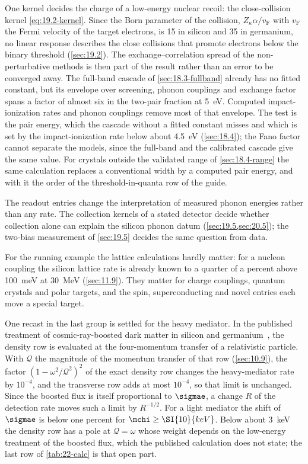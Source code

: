 One kernel decides the charge of a low-energy nuclear recoil: the close-collision kernel \cref{eq:19.2-kernel}. Since the Born parameter of the collision, $Z_\kappa\alpha/v_{\mathrm{F}}$ with $v_{\mathrm{F}}$ the Fermi velocity of the target electrons, is 15 in silicon and 35 in germanium, no linear response describes the close collisions that promote electrons below the binary threshold (\cref{sec:19.2}). The exchange--correlation spread of the non-perturbative methods is then part of the result rather than an error to be converged away. The full-band cascade of \cref{sec:18.3-fullband} already has no fitted constant, but its envelope over screening, phonon couplings and exchange factor spans a factor of almost six in the two-pair fraction at \SI{5}{eV}. Computed impact-ionization rates and phonon couplings remove most of that envelope. The test is the pair energy, which the cascade without a fitted constant misses and which is set by the impact-ionization rate below about \SI{4.5}{eV} (\cref{sec:18.4}); the Fano factor cannot separate the models, since the full-band and the calibrated cascade give the same value. For crystals outside the validated range of \cref{sec:18.4-range} the same calculation replaces a conventional width by a computed pair energy, and with it the order of the threshold-in-quanta row of the guide.

The readout entries change the interpretation of measured phonon energies rather than any rate. The collection kernels of a stated detector decide whether collection alone can explain the silicon phonon datum (\cref{sec:19.5,sec:20.5}); the two-bias measurement of \cref{sec:19.5} decides the same question from data.

For the running example the lattice calculations hardly matter: for a nucleon coupling the silicon lattice rate is already known to a quarter of a percent above \SI{100}{meV} at \SI{30}{MeV} (\cref{sec:11.9}). They matter for charge couplings, quantum crystals and polar targets, and the spin, superconducting and novel entries each move a special target.

One recast in the last group is settled for the heavy mediator. In the published treatment of cosmic-ray-boosted dark matter in silicon and germanium~\cite{liang2025plasmon}, the density row is evaluated at the four-momentum transfer of a relativistic particle. With $\mathcal{Q}$ the magnitude of the momentum transfer of that row (\cref{sec:10.9}), the factor $(1 - \omega^2/\mathcal{Q}^2)^2$ of the exact density row changes the heavy-mediator rate by $10^{-4}$, and the transverse row adds at most $10^{-4}$, so that limit is unchanged. Since the boosted flux is itself proportional to $\sigmae$, a change $R$ of the detection rate moves such a limit by $R^{-1/2}$. For a light mediator the shift of $\sigmae$ is below one percent for $\mchi \ge \SI{10}{keV}$. Below about \SI{3}{keV} the density row has a pole at $\mathcal{Q} = \omega$ whose weight depends on the low-energy treatment of the boosted flux, which the published calculation does not state; the last row of \cref{tab:22-calc} is that open part.

